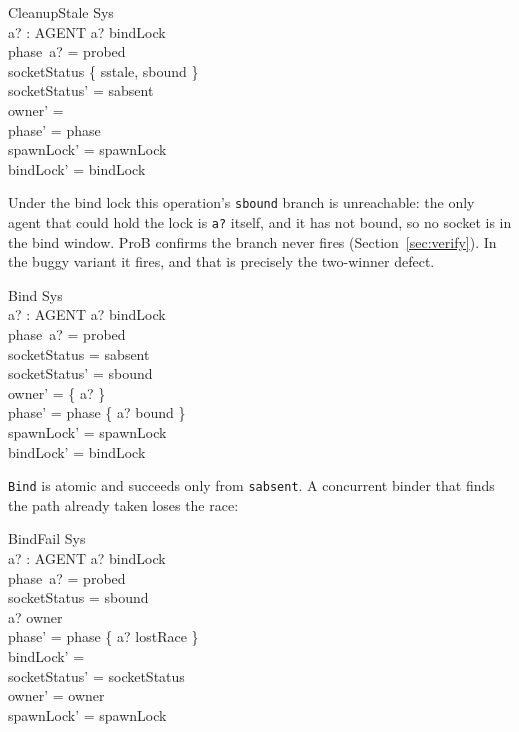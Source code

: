 \documentclass[a4paper,10pt,fleqn]{article}
\begin{document}
\begin{schema}{CleanupStale}
  \Delta Sys \\
  a? : AGENT
\where
  a? \in bindLock \\
  phase~a? = probed \\
  socketStatus \in \{ sstale, sbound \} \\
  socketStatus' = sabsent \\
  owner' = \emptyset \\
  phase' = phase \\
  spawnLock' = spawnLock \\
  bindLock' = bindLock
\end{schema}

Under the bind lock this operation's \texttt{sbound} branch is
unreachable: the only agent that could hold the lock is \texttt{a?}
itself, and it has not bound, so no socket is in the bind window.  ProB
confirms the branch never fires (Section~\ref{sec:verify}).  In the
buggy variant it fires, and that is precisely the two-winner defect.

\begin{schema}{Bind}
  \Delta Sys \\
  a? : AGENT
\where
  a? \in bindLock \\
  phase~a? = probed \\
  socketStatus = sabsent \\
  socketStatus' = sbound \\
  owner' = \{ a? \} \\
  phase' = phase \oplus \{ a? \mapsto bound \} \\
  spawnLock' = spawnLock \\
  bindLock' = bindLock
\end{schema}

\texttt{Bind} is atomic and succeeds only from \texttt{sabsent}.  A
concurrent binder that finds the path already taken loses the race:

\begin{schema}{BindFail}
  \Delta Sys \\
  a? : AGENT
\where
  a? \in bindLock \\
  phase~a? = probed \\
  socketStatus = sbound \\
  a? \notin owner \\
  phase' = phase \oplus \{ a? \mapsto lostRace \} \\
  bindLock' = \emptyset \\
  socketStatus' = socketStatus \\
  owner' = owner \\
  spawnLock' = spawnLock
\end{schema}
\end{document}
